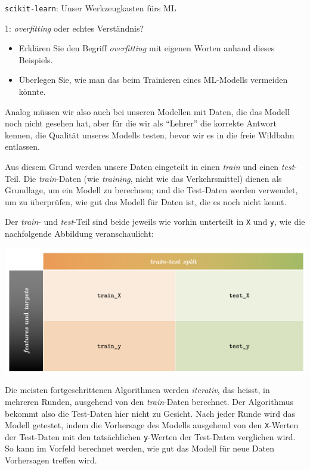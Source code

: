 \begin{lpu}{\texttt{scikit-learn}: Unser Werkzeugkasten fürs ML}
\begin{aufgabe}{1: \textit{overfitting} oder echtes Verständnis?}
\begin{itemize}
  \item Erklären Sie den Begriff \textit{overfitting} mit eigenen Worten anhand dieses Beispiels.
  \item Überlegen Sie, wie man das beim Trainieren eines ML-Modells vermeiden könnte.
\end{itemize}
\end{aufgabe}

Analog müssen wir also auch bei unseren Modellen mit Daten, die das Modell noch nicht gesehen hat, aber für die wir als ``Lehrer'' die korrekte Antwort kennen, die Qualität unseres Modells testen, bevor wir es in die freie Wildbahn entlassen.

Aus diesem Grund werden unsere Daten eingeteilt in einen \textit{train} und einen \textit{test}-Teil. Die \textit{train}-Daten (wie \textit{training}, nicht wie das Verkehrsmittel) dienen als Grundlage, um ein Modell zu berechnen; und die Test-Daten werden verwendet, um zu überprüfen, wie gut das Modell für Daten ist, die es noch nicht kennt.

Der \textit{train}- und \textit{test}-Teil sind beide jeweils wie vorhin unterteilt in \texttt{X} und \texttt{y}, wie die nachfolgende Abbildung veranschaulicht:

\vspace{1em}
\begin{center}
  \includegraphics[width=0.9\linewidth]{testtrain.png}
\end{center}

Die meisten fortgeschrittenen Algorithmen werden \textit{iterativ}, das heisst, in mehreren Runden, ausgehend von den \textit{train}-Daten berechnet. Der Algorithmus bekommt also die Test-Daten hier nicht zu Gesicht. Nach jeder Runde wird das Modell getestet, indem die Vorhersage des Modells ausgehend von den \texttt{X}-Werten der Test-Daten mit den tatsächlichen \texttt{y}-Werten der Test-Daten verglichen wird. So kann im Vorfeld berechnet werden, wie gut das Modell für neue Daten Vorhersagen treffen wird.





\end{lpu}

